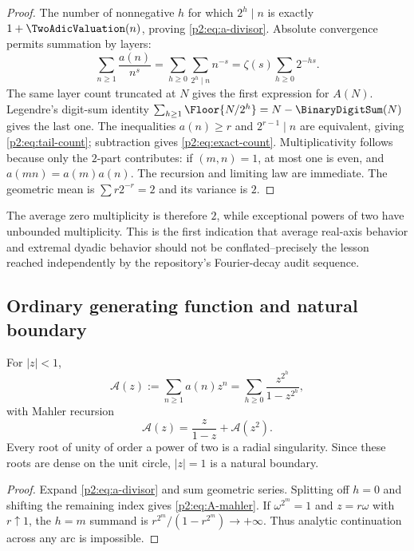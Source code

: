 \documentclass[11pt]{article}
\numberwithin{equation}{section}
\theoremstyle{definition}
\theoremstyle{remark}
\begin{document}
\begin{proof}
The number of nonnegative $h$ for which $2^h\mid n$ is exactly
$1+\TwoAdicValuation(n)$, proving \eqref{p2:eq:a-divisor}.  Absolute convergence permits
summation by layers:
\[
 \sum_{n\ge1}\frac{a(n)}{n^s}
 =\sum_{h\ge0}\sum_{2^h\mid n}n^{-s}
 =\zeta(s)\sum_{h\ge0}2^{-hs}.
\]
The same layer count truncated at $N$ gives the first expression for $A(N)$.
Legendre's digit-sum identity
$\sum_{h\ge1}\Floor{N/2^h}=N-\BinaryDigitSum(N)$ gives the last one.
The inequalities $a(n)\ge r$ and $2^{r-1}\mid n$ are equivalent, giving
\eqref{p2:eq:tail-count}; subtraction gives \eqref{p2:eq:exact-count}.
Multiplicativity follows because only the $2$-part contributes: if $(m,n)=1$,
at most one is even, and $a(mn)=a(m)a(n)$.  The recursion and limiting law are
immediate.  The geometric mean is $\sum r2^{-r}=2$ and its variance is $2$.
\end{proof}

\begin{remark}
The average zero multiplicity is therefore $2$, while exceptional powers of two
have unbounded multiplicity.  This is the first indication that average real-axis
behavior and extremal dyadic behavior should not be conflated--precisely the
lesson reached independently by the repository's Fourier-decay audit sequence.
\end{remark}

\subsection{Ordinary generating function and natural boundary}

\begin{proposition}
\label{p2:prop:ogf}
For $|z|<1$,
\begin{equation}
 \mathcal A(z):=\sum_{n\ge1}a(n)z^n
 =\sum_{h\ge0}\frac{z^{2^h}}{1-z^{2^h}},                  \label{p2:eq:A-ogf}
\end{equation}
with Mahler recursion
\begin{equation}
 \mathcal A(z)=\frac{z}{1-z}+\mathcal A(z^2).              \label{p2:eq:A-mahler}
\end{equation}
Every root of unity of order a power of two is a radial singularity.  Since these
roots are dense on the unit circle, $|z|=1$ is a natural boundary.
\end{proposition}

\begin{proof}
Expand \eqref{p2:eq:a-divisor} and sum geometric series.  Splitting off $h=0$
and shifting the remaining index gives \eqref{p2:eq:A-mahler}.  If $\omega^{2^m}=1$
and $z=r\omega$ with $r\uparrow1$, the $h=m$ summand is
$r^{2^m}/(1-r^{2^m})\to+\infty$.  Thus analytic continuation across any arc is
impossible.
\end{proof}
\end{document}
